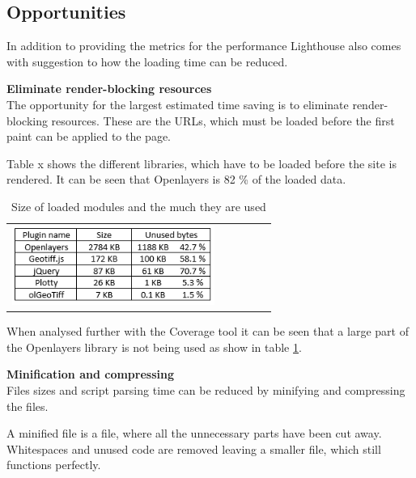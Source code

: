 
\subsection{Opportunities}
In addition to providing the metrics for the performance Lighthouse also comes with suggestion to how the loading time can be reduced. 

\textbf{Eliminate render-blocking resources}\\
The opportunity for the largest estimated time saving is to eliminate render-blocking resources. These are the URLs, which must be loaded before the first paint can be applied to the page. \citep{RenderBlocking}

Table x shows the different libraries, which have to be loaded before the site is rendered. It can be seen that Openlayers is 82 \% of the loaded data.

\begin{table}[htbp]
	\centering
	\begin{tabular}{l}
		\includegraphics[width=0.8\textwidth]{Pictures/tabPluginSize}
	\end{tabular}
	\caption{Size of loaded modules and the much they are used}
	\label{tabPluginSize}
\end{table}

When analysed further with the Coverage tool it can be seen that a large part of the Openlayers library is not being used as show in table \ref{tabPluginSize}.  


\textbf{Minification and compressing}\\
Files sizes and script parsing time can be reduced by minifying and compressing the files. 

A minified file is a file, where all the unnecessary parts have been cut away. Whitespaces and unused code are removed leaving a smaller file, which still functions perfectly. 

